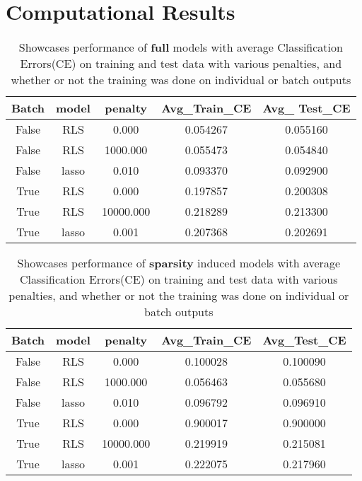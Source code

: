 \documentclass[12pt]{article}
\begin{document}
	\section[Look what i made]{Computational Results}
	\begin{table}[H]
		\begin{center}
			\begin{tabular}{ccccc}
				\toprule
				Batch &  model &    penalty &  Avg\_Train\_CE &  Avg\_ Test\_CE \\
				\midrule
				False &    RLS &      0.000 &  0.054267 &  0.055160 \\
				False &    RLS &   1000.000 &  0.055473 &  0.054840 \\
				False &  lasso &      0.010 &  0.093370 &  0.092900 \\
				True &    RLS &      0.000 &  0.197857 &  0.200308 \\
				True &    RLS &  10000.000 &  0.218289 &  0.213300 \\
				True &  lasso &      0.001 &  0.207368 &  0.202691 \\
				\bottomrule
			\end{tabular}
			
			\caption{Showcases performance of \textbf{full} models with average Classification Errors(CE) on training and test data with various penalties, and whether or not the training was done on individual or batch outputs}
		\end{center}
	\end{table}
	\begin{table}[H]
		\begin{center}
			\begin{tabular}{ccccc}
				\toprule
				Batch &  model &    penalty &  Avg\_Train\_CE &   Avg\_Test\_CE \\
				\midrule
				False &    RLS &      0.000 &  0.100028 &  0.100090 \\
				False &    RLS &   1000.000 &  0.056463 &  0.055680 \\
				False &  lasso &      0.010 &  0.096792 &  0.096910 \\
				True &    RLS &      0.000 &  0.900017 &  0.900000 \\
				True &    RLS &  10000.000 &  0.219919 &  0.215081 \\
				True &  lasso &      0.001 &  0.222075 &  0.217960 \\
				\bottomrule
			\end{tabular}
			
			\caption{Showcases performance of \textbf{sparsity} induced models with average Classification Errors(CE) on training and test data with various penalties, and whether or not the training was done on individual or batch outputs}
		\end{center}
	\end{table}
	
\end{document}
